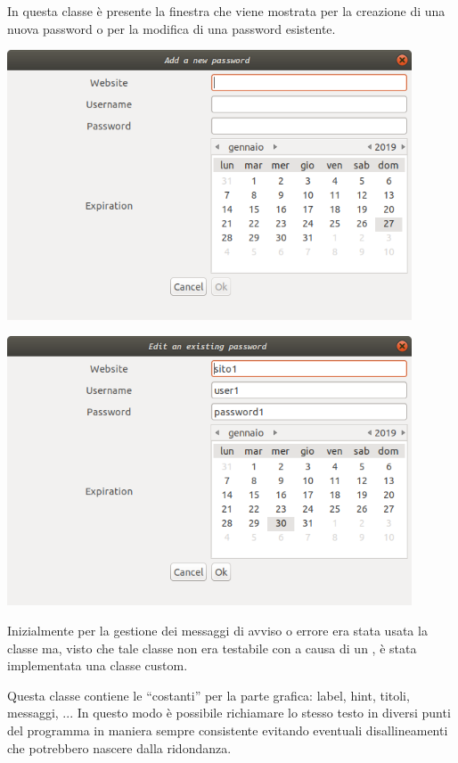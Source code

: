 \begin{myitemize}{}
	\item[\class{EditDialog}] In questa classe è presente la finestra che viene mostrata per la creazione di una nuova password o per la modifica di una password esistente.
		\begin{center}
		\includegraphics[width=12cm]{Immagini/AddGUI.png}
		\end{center}
				\begin{center}
		\includegraphics[width=12cm]{Immagini/EditGUI.png}
		\end{center}
		
	\item[\class{MessageDialog}] Inizialmente per la gestione dei messaggi di avviso o errore era stata usata la classe  ma, visto che tale classe non era testabile con  a causa di un , è stata implementata una classe custom.

	\item[\class{Labels}] Questa classe contiene le ``costanti'' per la parte grafica: label, hint, titoli, \\ messaggi, ... In questo modo è possibile richiamare lo stesso testo in diversi punti del programma in maniera sempre consistente evitando eventuali disallineamenti che potrebbero nascere dalla ridondanza.
\end{myitemize}

